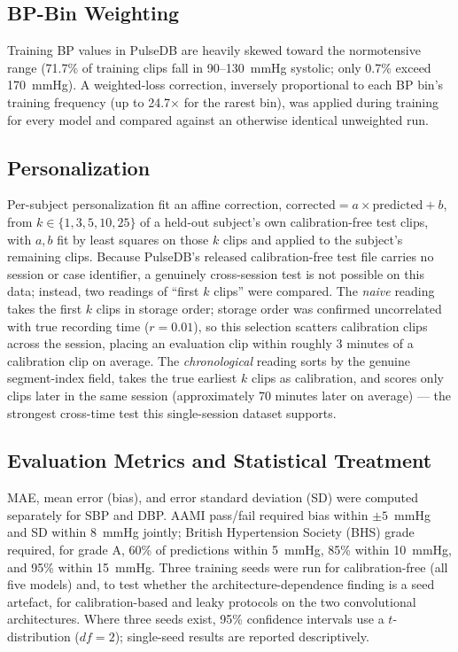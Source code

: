 \documentclass[journal]{IEEEtran}
\begin{document}
\subsection{BP-Bin Weighting}
Training BP values in PulseDB are heavily skewed toward the normotensive range (71.7\% of training clips fall in 90--130~mmHg systolic; only 0.7\% exceed 170~mmHg). A weighted-loss correction, inversely proportional to each BP bin's training frequency (up to 24.7$\times$ for the rarest bin), was applied during training for every model and compared against an otherwise identical unweighted run.

\subsection{Personalization}
Per-subject personalization fit an affine correction, $\mathrm{corrected} = a \times \mathrm{predicted} + b$, from $k \in \{1,3,5,10,25\}$ of a held-out subject's own calibration-free test clips, with $a,b$ fit by least squares on those $k$ clips and applied to the subject's remaining clips. Because PulseDB's released calibration-free test file carries no session or case identifier, a genuinely cross-session test is not possible on this data; instead, two readings of ``first $k$ clips'' were compared. The \textit{naive} reading takes the first $k$ clips in storage order; storage order was confirmed uncorrelated with true recording time ($r=0.01$), so this selection scatters calibration clips across the session, placing an evaluation clip within roughly 3 minutes of a calibration clip on average. The \textit{chronological} reading sorts by the genuine segment-index field, takes the true earliest $k$ clips as calibration, and scores only clips later in the same session (approximately 70 minutes later on average) --- the strongest cross-time test this single-session dataset supports.

\subsection{Evaluation Metrics and Statistical Treatment}
MAE, mean error (bias), and error standard deviation (SD) were computed separately for SBP and DBP. AAMI pass/fail required bias within $\pm5$~mmHg and SD within 8~mmHg jointly; British Hypertension Society (BHS) grade \cite{obrien1990} required, for grade A, 60\% of predictions within 5~mmHg, 85\% within 10~mmHg, and 95\% within 15~mmHg. Three training seeds were run for calibration-free (all five models) and, to test whether the architecture-dependence finding is a seed artefact, for calibration-based and leaky protocols on the two convolutional architectures. Where three seeds exist, 95\% confidence intervals use a $t$-distribution ($df=2$); single-seed results are reported descriptively.
\end{document}
